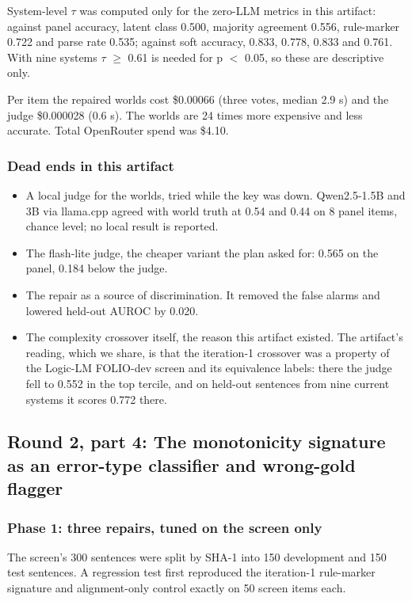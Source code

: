 \documentclass[11pt,letterpaper]{article}
\begin{document}
System-level $\tau$ was computed only for the zero-LLM metrics in this artifact: against panel accuracy, latent class 0.500, majority agreement 0.556, rule-marker 0.722 and parse rate 0.535; against soft accuracy, 0.833, 0.778, 0.833 and 0.761. With nine systems \textbar{}$\tau$\textbar{} $\geq$ 0.61 is needed for p $<$ 0.05, so these are descriptive only.

Per item the repaired worlds cost \$0.00066 (three votes, median 2.9 s) and the judge \$0.000028 (0.6 s). The worlds are 24 times more expensive and less accurate. Total OpenRouter spend was \$4.10.

\subsubsection{Dead ends in this artifact}

\begin{itemize}
\item {}A local judge for the worlds, tried while the key was down. Qwen2.5-1.5B and 3B via llama.cpp agreed with world truth at 0.54 and 0.44 on 8 panel items, chance level; no local result is reported.
\item {}The flash-lite judge, the cheaper variant the plan asked for: 0.565 on the panel, 0.184 below the judge.
\item {}The repair as a source of discrimination. It removed the false alarms and lowered held-out AUROC by 0.020.
\item {}The complexity crossover itself, the reason this artifact existed. The artifact's reading, which we share, is that the iteration-1 crossover was a property of the Logic-LM FOLIO-dev screen and its equivalence labels: there the judge fell to 0.552 in the top tercile, and on held-out sentences from nine current systems it scores 0.772 there.
\end{itemize}
\subsection{Round 2, part 4: The monotonicity signature as an error-type classifier and wrong-gold flagger}

\subsubsection{Phase 1: three repairs, tuned on the screen only}

The screen's 300 sentences were split by SHA-1 into 150 development and 150 test sentences. A regression test first reproduced the iteration-1 rule-marker signature and alignment-only control exactly on 50 screen items each.
\end{document}
